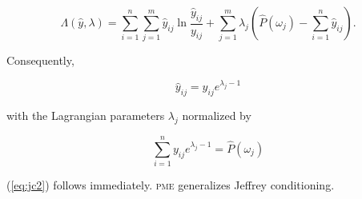 \begin{equation}
  \label{eq:jclag}
  \Lambda(\hat{y},\lambda)=\sum_{i=1}^{n}\sum_{j=1}^{m}\hat{y}_{ij}\ln\frac{\hat{y}_{ij}}{y_{ij}}+\sum_{j=1}^{m}\lambda_{j}\left(\hat{P}(\omega_{j})-\sum_{i=1}^{n}\hat{y}_{ij}\right).
\end{equation}

{\noindent}Consequently,

\begin{equation}
  \label{eq:jc4}
  \hat{y}_{ij}=y_{ij}e^{\lambda_{j}-1}
\end{equation}

{\noindent}with the Lagrangian parameters $\lambda_{j}$ normalized by

\begin{equation}
  \label{eq:jc5}
  \sum_{i=1}^{n}y_{ij}e^{\lambda_{j}-1}=\hat{P}(\omega_{j})
\end{equation}

{\noindent}(\ref{eq:jc2}) follows immediately. \textsc{pme}
generalizes Jeffrey conditioning.
